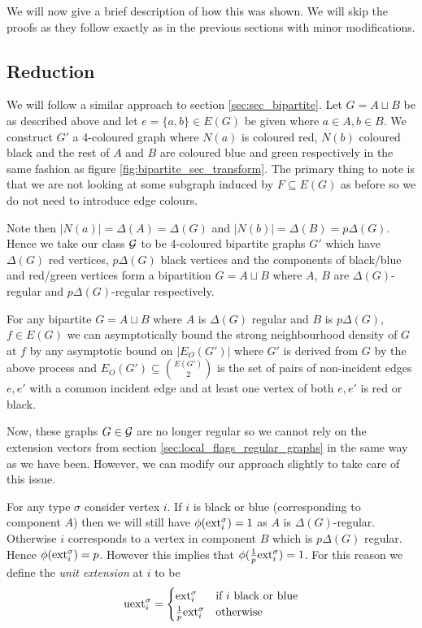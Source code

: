 We will now give a brief description of how this was shown. We will skip the proofs as they
follow exactly as in the previous sections with minor modifications.

\subsection{Reduction}

We will follow a similar approach to section \ref{sec:sec_bipartite}. Let
$G=A \sqcup B$ be as described above and let $e=\{a, b\}\in E(G)$ be given where
$a \in A, b \in B$. We construct $G'$ a 4-coloured graph where $N(a)$ is coloured red,
$N(b)$ coloured black and the rest of $A$ and $B$ are coloured blue and green respectively
in the same fashion as figure \ref{fig:bipartite_sec_transform}. The primary thing to 
note is that we are not looking at some subgraph induced by $F\subseteq E(G)$ as before
so we do not need to introduce edge colours.

Note then $|N(a)|=\Delta(A)=\Delta(G)$ and $|N(b)|=\Delta(B)=p\Delta(G)$. Hence we
take our class $\mathcal{G}$ to be 4-coloured bipartite graphs $G'$ which have
$\Delta(G)$ red vertices, $p\Delta(G)$ black vertices and the components of
black/blue and red/green vertices form a bipartition $G=A\sqcup B$ where
$A$, $B$ are $\Delta(G)$-regular and $p\Delta(G)$-regular respectively.

\begin{lemma}
    For any bipartite $G=A\sqcup B$ where $A$ is $\Delta(G)$ regular
    and $B$ is $p\Delta(G)$, $f\in E(G)$ we can asymptotically bound
    the strong neighbourhood density of $G$ at $f$ by any asymptotic
    bound on $|E_O(G')|$ where $G'$ is derived from $G$ by the above
    process and $E_O(G')\subseteq \binom{E(G')}{2}$
    is the set of pairs of non-incident
    edges $e,e'$ with a common incident edge and at least one vertex of both $e,e'$ 
    is red or black.
\end{lemma}

Now, these graphs $G\in\mathcal{G}$ are no longer regular so we cannot rely on the
extension vectors from section \ref{sec:local_flags_regular_graphs} in the same way
as we have been. However, we can modify our approach slightly to take care of this issue.

For any type $\sigma$ consider vertex $i$. If $i$ is black or blue (corresponding to
component $A$) then we will still have $\phi(\mathrm{ext}_i^\sigma)=1$ as $A$ is
$\Delta(G)$-regular. Otherwise $i$ corresponds to a vertex in component $B$
which is $p\Delta(G)$ regular. Hence $\phi(\mathrm{ext}_i^\sigma)=p$. However this
implies that $\phi(\frac{1}{p}\mathrm{ext}_i^\sigma) = 1$. For this reason we define
the \textit{unit extension} at $i$ to be
\[
    \mathrm{uext}_i^\sigma = \begin{cases}
        \mathrm{ext}_i^\sigma & \text{if}\ i\ \text{black or blue}\\
        \frac{1}{p}\mathrm{ext}_i^\sigma & \text{otherwise}
    \end{cases}
\]


